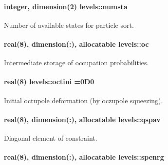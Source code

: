 \paragraph[{\texorpdfstring{numsta}{numsta}}]{\setlength{\rightskip}{0pt plus 5cm}integer, dimension(2) levels\+::numsta}\hypertarget{namespacelevels_a6eac8703a80522d7c3404d75a7e07e31}{}\label{namespacelevels_a6eac8703a80522d7c3404d75a7e07e31}


Number of available states for particle sort. 

\paragraph[{\texorpdfstring{oc}{oc}}]{\setlength{\rightskip}{0pt plus 5cm}real(8), dimension(\+:), allocatable levels\+::oc}\hypertarget{namespacelevels_a9f3b4e034b5daae6cfb8bda259926b32}{}\label{namespacelevels_a9f3b4e034b5daae6cfb8bda259926b32}


Intermediate storage of occupation probabilities. 

\paragraph[{\texorpdfstring{octini}{octini}}]{\setlength{\rightskip}{0pt plus 5cm}real(8) levels\+::octini =0\+D0}\hypertarget{namespacelevels_a81fc7d136ad35187b994a2fd527c40ac}{}\label{namespacelevels_a81fc7d136ad35187b994a2fd527c40ac}


Initial octupole deformation (by oczupole squeezing). 

\paragraph[{\texorpdfstring{qspav}{qspav}}]{\setlength{\rightskip}{0pt plus 5cm}real(8), dimension(\+:), allocatable levels\+::qspav}\hypertarget{namespacelevels_aa793d2f1b6ed97cd9c5399e4c1928337}{}\label{namespacelevels_aa793d2f1b6ed97cd9c5399e4c1928337}


Diagonal element of constraint. 

\paragraph[{\texorpdfstring{spenrg}{spenrg}}]{\setlength{\rightskip}{0pt plus 5cm}real(8), dimension(\+:), allocatable levels\+::spenrg}\hypertarget{namespacelevels_aa8277bbd2042d8f92caeace6331d01d4}{}\label{namespacelevels_aa8277bbd2042d8f92caeace6331d01d4}



